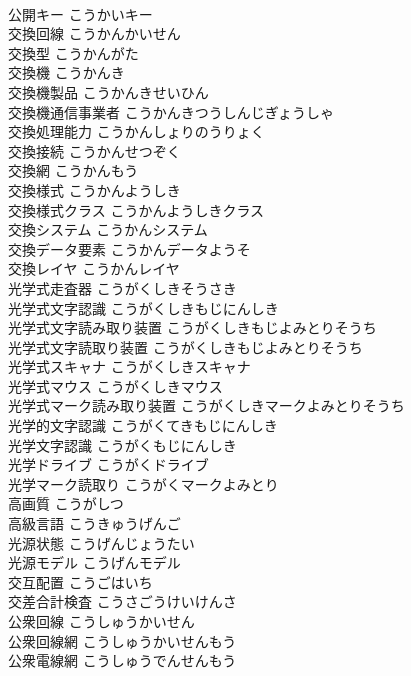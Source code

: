 \documentclass[8pt]{extreport}
\begin{document}
\begin{CJK}{UTF8}{min}
\\	公開キー	こうかいキー	
\\	交換回線	こうかんかいせん	
\\	交換型	こうかんがた	
\\	交換機	こうかんき	
\\	交換機製品	こうかんきせいひん	
\\	交換機通信事業者	こうかんきつうしんじぎょうしゃ	
\\	交換処理能力	こうかんしょりのうりょく	
\\	交換接続	こうかんせつぞく	
\\	交換網	こうかんもう	
\\	交換様式	こうかんようしき	
\\	交換様式クラス	こうかんようしきクラス	
\\	交換システム	こうかんシステム	
\\	交換データ要素	こうかんデータようそ	
\\	交換レイヤ	こうかんレイヤ	
\\	光学式走査器	こうがくしきそうさき	
\\	光学式文字認識	こうがくしきもじにんしき	
\\	光学式文字読み取り装置	こうがくしきもじよみとりそうち	
\\	光学式文字読取り装置	こうがくしきもじよみとりそうち	
\\	光学式スキャナ	こうがくしきスキャナ	
\\	光学式マウス	こうがくしきマウス	
\\	光学式マーク読み取り装置	こうがくしきマークよみとりそうち	
\\	光学的文字認識	こうがくてきもじにんしき	
\\	光学文字認識	こうがくもじにんしき	
\\	光学ドライブ	こうがくドライブ	
\\	光学マーク読取り	こうがくマークよみとり	
\\	高画質	こうがしつ	
\\	高級言語	こうきゅうげんご	
\\	光源状態	こうげんじょうたい	
\\	光源モデル	こうげんモデル	
\\	交互配置	こうごはいち	
\\	交差合計検査	こうさごうけいけんさ	
\\	公衆回線	こうしゅうかいせん	
\\	公衆回線網	こうしゅうかいせんもう	
\\	公衆電線網	こうしゅうでんせんもう	

\end{CJK}
\end{document}
